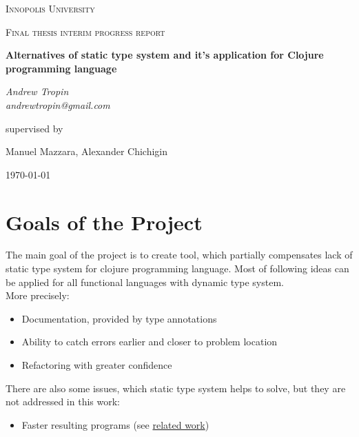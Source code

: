 \documentclass[12pt,a4paper]{report}
\begin{document}
\begin{titlepage}
	\centering
	{\scshape\LARGE Innopolis University \par}
	\vspace{1cm}
	{\scshape\Large Final thesis interim progress report \par}
	\vspace{1.5cm}
	{\huge\bfseries
    Alternatives of static type system and it's application for Clojure programming language
    \par}
	\vspace{2cm}
	{\Large\itshape Andrew Tropin\\
    andrewtropin@gmail.com
    \par}
	\vfill
	supervised by\par
	Manuel Mazzara, Alexander Chichigin

	\vfill

	{\large \today\par}
\end{titlepage}

\section*{Goals of the Project}

The main goal of the project is to create tool, which partially compensates lack
of static type system for clojure programming language. Most of following ideas
can be applied for all functional languages with dynamic type system.\\

More precisely:
\begin{itemize}
\item Documentation, provided by type annotations
\item Ability to catch errors earlier and closer to problem location
\item Refactoring with greater confidence
\end{itemize}

There are also some issues, which static type system helps to solve, but they are not
addressed in this work:
\begin{itemize}
\item Faster resulting programs
  (see \href{https://www.youtube.com/watch?v=yGko70hIEwk&t=295s}{related work})
\end{itemize}
\end{document}
